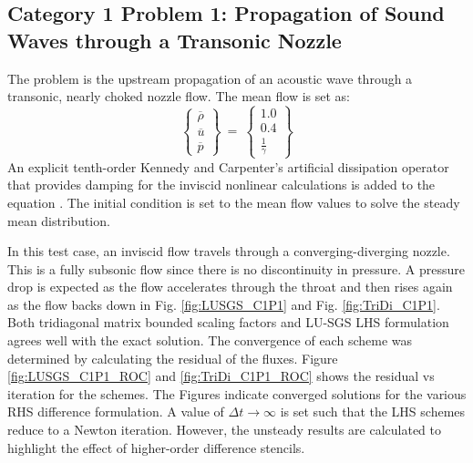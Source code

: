 \documentclass[conf]{new-aiaa}
\begin{document}
\subsection{Category 1 Problem 1: Propagation of Sound Waves through a Transonic Nozzle}

The problem is the upstream propagation of an acoustic wave through a transonic, nearly choked nozzle flow. 
The mean flow is set as:
\begin{equation*}
	\left\{
	\begin{matrix}
		\overline{\rho} \\
		\overline{u} \\
		\overline{p}
	\end{matrix}
	\right\}~=~
	\left\{
	\begin{matrix}
		1.0 \\
		0.4 \\
		\frac{1}{\gamma}
	\end{matrix}
	\right\}
\end{equation*}
An explicit tenth-order Kennedy and Carpenter's artificial dissipation operator that provides damping for the inviscid nonlinear calculations is added to the equation \cite{Kennedy_Carpt}. The initial condition is set to the mean flow values to solve the steady mean distribution. 

In this test case, an inviscid flow travels through a converging-diverging nozzle. 
This is a fully subsonic flow since there is no discontinuity in pressure.
A pressure drop is expected as the flow accelerates through the throat and then rises again as the flow backs down in Fig. \ref{fig:LUSGS_C1P1} and Fig. \ref{fig:TriDi_C1P1}. 
Both tridiagonal matrix bounded scaling factors and LU-SGS LHS formulation agrees well with the exact solution. 
The convergence of each scheme was determined by calculating the residual of the fluxes. 
Figure \ref{fig:LUSGS_C1P1_ROC} and \ref{fig:TriDi_C1P1_ROC} shows the residual vs iteration for the schemes. 
The Figures indicate converged solutions for the various RHS difference formulation. 
A value of $\Delta{t}\to\infty$ is set such that the LHS schemes reduce to a Newton iteration. 
However, the unsteady results are calculated to highlight the effect of higher-order difference stencils.  
\end{document}
